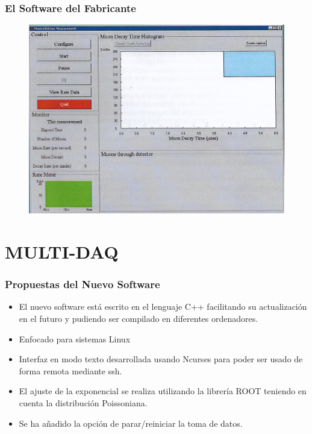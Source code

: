 \documentclass[xcolor=dvipsnames]{beamer}
\begin{document}
			\begin{frame}
				\frametitle{El Software del Fabricante}
				\begin{figure}[H]
					\centering
					\includegraphics[scale=0.7]{Fotos/Scanned_Document.png}
				\end{figure}
			\end{frame}


		\section{MULTI-DAQ}

			\begin{frame}
				\frametitle{Propuestas del Nuevo Software}

					\begin{itemize}
						\item<1-> El nuevo software está escrito en el lenguaje C++ facilitando su actualización en el futuro y pudiendo ser compilado en diferentes ordenadores.

						\item<2-> Enfocado para sistemas Linux

						\item<3-> Interfaz en modo texto desarrollada usando Ncurses para poder ser usado de forma remota mediante ssh.

						\item<4-> El ajuste de la exponencial se realiza utilizando la librería ROOT teniendo en cuenta la distribución Poissoniana.

						\item<5-> Se ha añadido la opción de parar/reiniciar la toma de datos. 
					\end{itemize}
			\end{frame}
\end{document}
